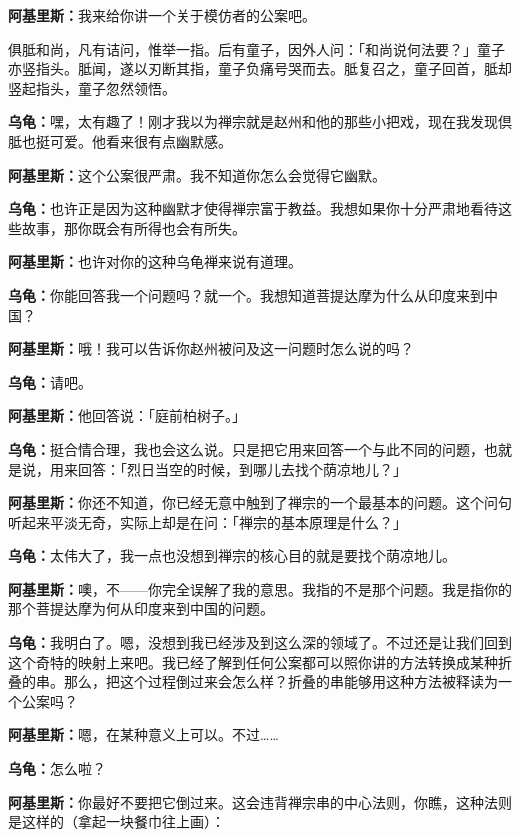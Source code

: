 \documentclass[
  12pt,
  twoside,
  openright,
  oldfontcommands,
]{memoir}
\newcommand{\kaitismall}[1]{{\kaitifamily\small #1}}
\newcommand{\dialogname}[1]{{\heifamily\bfseries #1}}
\begin{document}
\dialogname{阿基里斯：}我来给你讲一个关于模仿者的公案吧。

俱胝和尚，凡有诘问，惟举一指。后有童子，因外人问：「和尚说何法要？」童子亦竖指头。胝闻，遂以刃断其指，童子负痛号哭而去。胝复召之，童子回首，胝却竖起指头，童子忽然领悟。

\dialogname{乌龟：}嘿，太有趣了！刚才我以为禅宗就是赵州和他的那些小把戏，现在我发现倶胝也挺可爱。他看来很有点幽默感。

\dialogname{阿基里斯：}这个公案很严肃。我不知道你怎么会觉得它幽默。

\dialogname{乌龟：}也许正是因为这种幽默才使得禅宗富于教益。我想如果你十分严肃地看待这些故事，那你既会有所得也会有所失。

\dialogname{阿基里斯：}也许对你的这种乌龟禅来说有道理。

\dialogname{乌龟：}你能回答我一个问题吗？就一个。我想知道菩提达摩为什么从印度来到中国？

\dialogname{阿基里斯：}哦！我可以告诉你赵州被问及这一问题时怎么说的吗？

\dialogname{乌龟：}请吧。

\dialogname{阿基里斯：}他回答说：「庭前柏树子。」

\dialogname{乌龟：}挺合情合理，我也会这么说。只是把它用来回答一个与此不同的问题，也就是说，用来回答：「烈日当空的时候，到哪儿去找个荫凉地儿？」

\dialogname{阿基里斯：}你还不知道，你已经无意中触到了禅宗的一个最基本的问题。这个问句听起来平淡无奇，实际上却是在问：「禅宗的基本原理是什么？」

\dialogname{乌龟：}太伟大了，我一点也没想到禅宗的核心目的就是要找个荫凉地儿。

\dialogname{阿基里斯：}噢，不------你完全误解了我的意思。我指的不是那个问题。我是指你的那个菩提达摩为何从印度来到中国的问题。

\dialogname{乌龟：}我明白了。嗯，没想到我已经涉及到这么深的领域了。不过还是让我们回到这个奇特的映射上来吧。我已经了解到任何公案都可以照你讲的方法转换成某种折叠的串。那么，把这个过程倒过来会怎么样？折叠的串能够用这种方法被释读为一个公案吗？

\dialogname{阿基里斯：}嗯，在某种意义上可以。不过\ldots\ldots{}

\dialogname{乌龟：}怎么啦？

\dialogname{阿基里斯：}你最好不要把它倒过来。这会违背禅宗串的中心法则，你瞧，这种法则是这样的\kaitismall{（拿起一块餐巾往上画）}：

\end{document}
